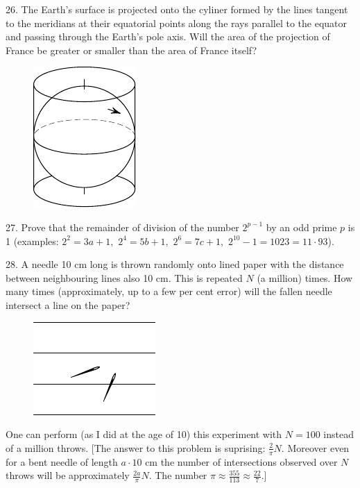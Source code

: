 \begin{problem}{26.}
	The Earth's surface is projected onto the cyliner formed by the lines tangent to the meridians
	at their equatorial points along the rays parallel to the equator and passing through the Earth's pole axis.
	Will the area of the projection of France be greater or smaller than the area of France itself?
	\begin{figure}[h]
	\centering
	\footnotesize
	\includegraphics[scale=1]{taskbook-10}
	\end{figure}
\end{problem}

\begin{problem}{27.}
	Prove that the remainder of division of the number $2^{p-1}$ by an odd prime $p$ is 1
	(examples: $2^2 = 3a +1,$ $2^4 = 5b+1,$ $2^6 = 7c+1,$ 
	$2^{10} - 1 = 1023 = 11\cdot 93$).  
\end{problem}

\begin{problem}{28.}
	A needle 10 cm long is thrown randomly onto lined paper with the distance between neighbouring
	lines also 10 cm. This is repeated
	$N$ (a million) times. 
	How many times (approximately, up to a few per
	cent error) will the fallen needle intersect a line on the paper?
	\begin{figure}[h]
	\centering
	\footnotesize
	\includegraphics[scale=1]{taskbook-12}
	\end{figure}

	One can perform (as I did at the age of 10) this experiment with $N=100$ instead of a million throws.
	[The answer to this problem is suprising: $\frac2{\pi}N$. Moreover even for a bent needle of length $a \cdot 10$
	cm the number of intersections observed over $N$ throws will be approximately $\frac{2a}{\pi}N$. 
	The number $\pi \approx  \frac{355}{113} \approx \frac{22}7.$]
\end{problem}

